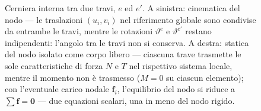 \begin{figure}[htbp]
{
	}%
	\caption{Cerniera interna tra due travi, $e$ ed $e'$. A sinistra:
		cinematica del nodo --- le traslazioni $(u_i, v_i)$ nel
		riferimento globale sono condivise da entrambe le travi,
		mentre le rotazioni $\vartheta^e$ e $\vartheta^{e'}$ restano
		indipendenti: l'angolo tra le travi non si conserva.
		A destra: statica del nodo isolato come corpo libero ---
		ciascuna trave trasmette le sole caratteristiche di forza
		$N$ e $T$ nel rispettivo sistema locale, mentre il momento
		non è trasmesso ($M = 0$ su ciascun elemento); con
		l'eventuale carico nodale $\mathbf{f}_i$, l'equilibrio del
		nodo si riduce a $\sum\mathbf{f}=\mathbf{0}$ --- due
		equazioni scalari, una in meno del nodo rigido.}
	\label{fig:cerniera_interna}
\end{figure}
